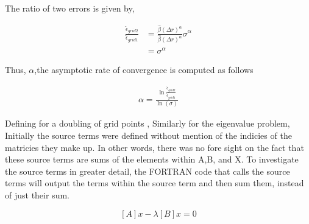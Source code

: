 The ratio of two errors is given by,

\begin{align*}
    \frac{\hat{\epsilon}_{grid 2}}{\hat{\epsilon}_{grid 1}} &= 
    \frac{\hat{\beta}(\Delta r )^{\alpha}}{\hat{\beta}(\Delta r )^{\alpha}} \sigma^{\alpha} \\ &= \sigma^{\alpha}
\end{align*}

Thus, $\alpha$,the asymptotic rate of convergence is computed as follows 

\begin{align*}
    \alpha = \frac{
        \ln \frac{
            \hat{\epsilon}_{grid 2}
    }{\hat{\epsilon}_{grid 1} }}
    {\ln\left( \sigma \right) }
\end{align*}

Defining  for a doubling of grid points ,
%
%
Similarly for the eigenvalue problem, 
Initially the source terms were defined without mention of the indicies of the 
matricies they make up. In other words, there was no fore sight on the fact 
that these source terms are sums of the elements within A,B, and X. 
To investigate the source terms in greater detail, the FORTRAN code 
that calls the source terms will output the terms within the source term 
and then sum them, instead of just their sum.

\[ [A]x - \lambda [B]x = 0 \]



